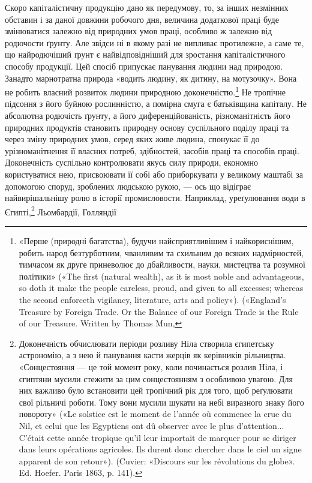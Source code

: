 Скоро капіталістичну продукцію дано як передумову, то, за
інших незмінних обставин і за даної довжини робочого дня, величина
додаткової праці буде змінюватися залежно від природних
умов праці, особливо ж залежно від родючости ґрунту. Але звідси
ні в якому разі не випливає протилежне, а саме те, що найродючіший
ґрунт є найвідповідніший для зростання капіталістичного
способу продукції. Цей спосіб припускає панування людини над
природою. Занадто марнотратна природа «водить людину, як
дитину, на мотузочку». Вона не робить власний розвиток людини
природною доконечністю.\footnote{
«Перше (природні багатства), будучи найсприятливішим і найкориснішим,
робить народ безтурботним, чванливим та схильним до всяких
надмірностей, тимчасом як друге приневолює до дбайливости, науки,
мистецтва та розумної політики» («The first (natural wealth), as it
is most noble and advantageous, so doth it make the people careless, proud,
and given to all excesses; whereas the second enforceth vigilancy, literature,
arts and policy»). («England’s Treasure by Foreign Trade. Or the Balance
of our Foreign Trade is the Rule of our Treasure. Written by Thomas Mun,
} Не тропічне підсоння з його буйною
рослинністю, а помірна смуга є батьківщина капіталу. Не абсолютна
родючість ґрунту, а його диференційованість, різноманітність
його природних продуктів становить природну основу
суспільного поділу праці та через зміну природних умов, серед
яких живе людина, спонукає її до урізноманітнення її власних
потреб, здібностей, засобів праці та способів праці. Доконечність
суспільно контролювати якусь силу природи, економно користуватися
нею, присвоювати її собі або приборкувати у великому
маштабі за допомогою споруд, зроблених людською рукою, —
ось що відіграє найвирішальнішу ролю в історії промисловости.
Наприклад, уреґулювання води в Єгипті,\footnote{
Доконечність обчислювати періоди розливу Ніла створила єгипетську
астрономію, а з нею й панування касти жерців як керівників
рільництва. «Сонцестояння — це той момент року, коли починається
розлив Ніла, і єгиптяни мусили стежити за цим сонцестоянням з особливою
увагою. Для них важливо було встановити цей тропічний рік для
того, щоб реґулювати свої рільничі роботи. Тому вони мусили шукати
на небі виразного знаку його повороту» («Le solstice est le moment de
l’année où commence la crue du Nil, et celui que les Egyptiens ont dû
observer avec le plus d’attention... C’était cette année tropique qu’il leur
importait de marquer pour se diriger dans leurs opérations agricoles. Ils
durent donc chercher dans le ciel un signe apparent de son retour»). (Cuvier:
«Discours sur les révolutions du globe». Ed. Hoefer. Paris 1863, p. 141).
} Льомбардії, Голляндії
